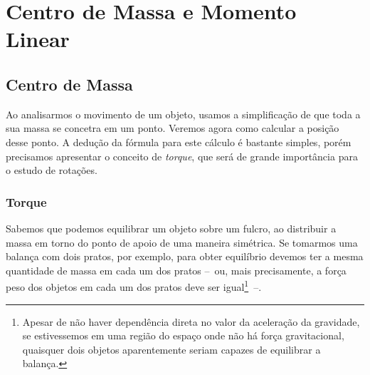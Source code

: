 \chapter{Centro de Massa e Momento Linear}


\section{Centro de Massa}

Ao analisarmos o movimento de um objeto, usamos a simplificação de que toda a sua massa se concetra em um ponto. Veremos agora como calcular a posição desse ponto. A dedução da fórmula para este cálculo é bastante simples, porém precisamos apresentar o conceito de \emph{torque}, que será de grande importância para o estudo de rotações.

\subsection{Torque}

Sabemos que podemos equilibrar um objeto sobre um fulcro, ao distribuir a massa em torno do ponto de apoio de uma maneira simétrica. Se tomarmos uma balança com dois pratos, por exemplo, para obter equilíbrio devemos ter a mesma quantidade de massa em cada um dos pratos --~ou, mais precisamente, a força peso dos objetos em cada um dos pratos deve ser igual\footnote{Apesar de não haver dependência direta no valor da aceleração da gravidade, se estivessemos em uma região do espaço onde não há força gravitacional, quaisquer dois objetos aparentemente seriam capazes de equilibrar a balança.}~--. 

